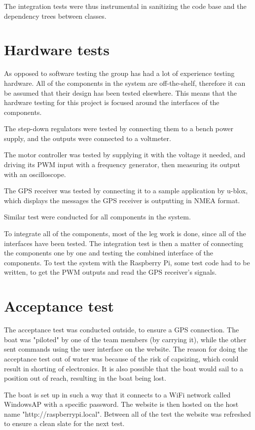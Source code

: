 The integration tests were thus instrumental in sanitizing the code base and the dependency trees between classes.

\section{Hardware tests}
As opposed to software testing the group has had a lot of experience testing hardware. All of the components in the system are off-the-shelf, therefore it can be assumed that their design has been tested elsewhere. This means that the hardware testing for this project is focused around the interfaces of the components.

The step-down regulators were tested by connecting them to a bench power supply, and the outputs were connected to a voltmeter.

The motor controller was tested by supplying it with the voltage it needed, and driving its PWM input with a frequency generator, then measuring its output with an oscilloscope. 

The GPS receiver was tested by connecting it to a sample application by u-blox, which displays the messages the GPS receiver is outputting in NMEA format.

Similar test were conducted for all components in the system. 

To integrate all of the components, most of the leg work is done, since all of the interfaces have been tested. The integration test is then a matter of connecting the components one by one and testing the combined interface of the components. To test the system with the Raspberry Pi, some test code had to be written, to get the PWM outputs and read the GPS receiver's signals.


\section{Acceptance test}
The acceptance test was conducted outside, to ensure a GPS connection. The boat was "piloted" by one of the team members (by carrying it), while the other sent commands using the user interface on the website. The reason for doing the acceptance test out of water was because of the risk of capsizing, which could result in shorting of electronics. It is also possible that the boat would sail to a position out of reach, resulting in the boat being lost.

The boat is set up in such a way that it connects to a WiFi network called WindowsAP with a specific password. The website is then hosted on the host name "http://\-raspberrypi.\-local". Between all of the test the website was refreshed to ensure a clean slate for the next test.